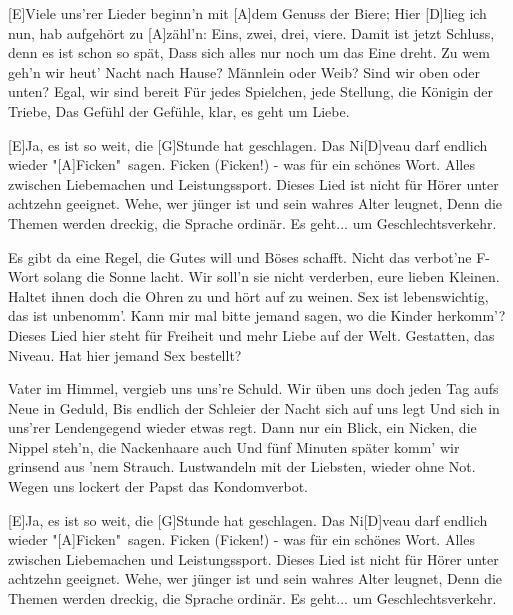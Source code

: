 

\begin{guitar}
	[E]Viele uns'rer Lieder beginn'n mit [A]dem Genuss der Biere;
	Hier [D]lieg ich nun, hab aufgehört zu [A]zähl'n: Eins, zwei, drei, viere.
	Damit ist jetzt Schluss, denn es ist schon so spät,
	Dass sich alles nur noch um das Eine dreht.
	Zu wem geh'n wir heut' Nacht nach Hause? Männlein oder Weib?
	Sind wir oben oder unten? Egal, wir sind bereit
	Für jedes Spielchen, jede Stellung, die Königin der Triebe,
	Das Gefühl der Gefühle, klar, es geht um Liebe.
	
  \smallskip
	[E]Ja, es ist so weit, die [G]Stunde hat geschlagen.
	Das Ni[D]veau darf endlich wieder "[A]Ficken"\ sagen.
	Ficken (Ficken!) - was für ein schönes Wort.
	Alles zwischen Liebemachen und Leistungssport.
	Dieses Lied ist nicht für Hörer unter achtzehn geeignet.
	Wehe, wer jünger ist und sein wahres Alter leugnet,
	Denn die Themen werden dreckig, die Sprache ordinär.
	Es geht... um Geschlechtsverkehr.
	
	Es gibt da eine Regel, die Gutes will und Böses schafft.
	Nicht das verbot'ne F-Wort solang die Sonne lacht.
	Wir soll'n sie nicht verderben, eure lieben Kleinen.
	Haltet ihnen doch die Ohren zu und hört auf zu weinen.
	Sex ist lebenswichtig, das ist unbenomm'.
	Kann mir mal bitte jemand sagen, wo die Kinder herkomm'?
	Dieses Lied hier steht für Freiheit und mehr Liebe auf der Welt.
	Gestatten, das Niveau. Hat hier jemand Sex bestellt?
	
	 
	
	\pagebreak
	
	Vater im Himmel, vergieb uns uns're Schuld.
	Wir üben uns doch jeden Tag aufs Neue in Geduld,
	Bis endlich der Schleier der Nacht sich auf uns legt
	Und sich in uns'rer Lendengegend wieder etwas regt.
	Dann nur ein Blick, ein Nicken, die Nippel steh'n, die Nackenhaare auch
	Und fünf Minuten später komm' wir grinsend aus 'nem Strauch.
	Lustwandeln mit der Liebsten, wieder ohne Not.
	Wegen uns lockert der Papst das Kondomverbot.
	
  \smallskip
	[E]Ja, es ist so weit, die [G]Stunde hat geschlagen.
	Das Ni[D]veau darf endlich wieder "[A]Ficken"\ sagen.
	Ficken (Ficken!) - was für ein schönes Wort.
	Alles zwischen Liebemachen und Leistungssport.
	Dieses Lied ist nicht für Hörer unter achtzehn geeignet.
	Wehe, wer jünger ist und sein wahres Alter leugnet,
	Denn die Themen werden dreckig, die Sprache ordinär.
	Es geht... um Geschlechtsverkehr.
	

\end{guitar}
